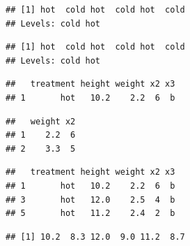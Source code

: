 \documentclass[krantz2]{krantz}\usepackage{knitr}
\begin{document}
\begin{knitrout}\footnotesize
{}\color{fgcolor}\begin{kframe}
\begin{alltt}
\hlstd{a.df[ ,} \hlstd{]}
\end{alltt}
\begin{verbatim}
## [1] hot  cold hot  cold hot  cold
## Levels: cold hot
\end{verbatim}
\begin{alltt}
\hlstd{a.df[ ,} \hlstd{]}
\end{alltt}
\begin{verbatim}
## [1] hot  cold hot  cold hot  cold
## Levels: cold hot
\end{verbatim}
\begin{alltt}
\hlstd{a.df[}\hlstd{, ]}
\end{alltt}
\begin{verbatim}
##   treatment height weight x2 x3
## 1       hot   10.2    2.2  6  b
\end{verbatim}
\begin{alltt}
\hlstd{a.df[}\hlopt{:}\hlstd{,} \hlstd{(}\hlstd{,} \hlstd{,} \hlstd{,} \hlstd{,} \hlstd{)]}
\end{alltt}
\begin{verbatim}
##   weight x2
## 1    2.2  6
## 2    3.3  5
\end{verbatim}
\begin{alltt}
\hlstd{a.df[a.df}\hlopt{$} \hlopt{==}  \hlstd{, ]}
\end{alltt}
\begin{verbatim}
##   treatment height weight x2 x3
## 1       hot   10.2    2.2  6  b
## 3       hot   12.0    2.5  4  b
## 5       hot   11.2    2.4  2  b
\end{verbatim}
\begin{alltt}
\hlstd{a.df[a.df}\hlopt{$} \hlopt{>} \hlstd{,} \hlstd{]}
\end{alltt}
\begin{verbatim}
## [1] 10.2  8.3 12.0  9.0 11.2  8.7
\end{verbatim}
\end{kframe}
\end{knitrout}
\end{document}
